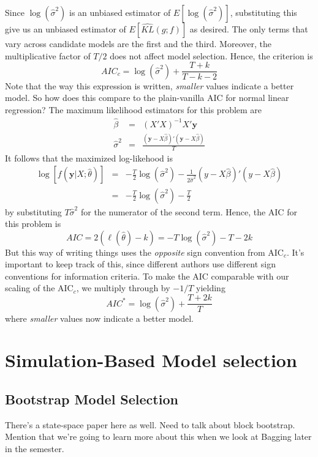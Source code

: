 \documentclass[12pt]{article}
\theoremstyle{definition}
\begin{document}
Since $\log(\widehat{\sigma}^2)$ is an unbiased estimator of $E[\log(\widehat{\sigma}^2)]$, substituting this give us an unbiased estimator of $E\left[\widehat{KL}(g;f) \right]$ as desired.
The only terms that vary across candidate models are the first and the third. Moreover, the multiplicative factor of $T/2$ does not affect model selection. Hence, the criterion is
$$AIC_c = \log(\widehat{\sigma}^2) + \frac{T + k}{T - k -2}$$
Note that the way this expression is written, \emph{smaller} values indicate a better model. So how does this compare to the plain-vanilla AIC for normal linear regression? The maximum likelihood estimators for this problem are
\begin{eqnarray*}
\widehat{\beta} &=& (X'X)^{-1}X'\mathbf{y}\\
\widehat{\sigma}^2 &=& \frac{(\mathbf{y} - X\widehat{\beta})'(\mathbf{y} - X\widehat{\beta})}{T}
\end{eqnarray*}
It follows that the maximized log-likehood is
\begin{eqnarray*}
\log\left[f(\mathbf{y}|X;\widehat{\theta})\right] &=& -\frac{T}{2} \log(\widehat{\sigma}^2) - \frac{1}{2\widehat{\sigma}^2}(y - X\widehat{\beta})'(y -X\widehat{\beta})\\
&=& -\frac{T}{2} \log(\widehat{\sigma}^2) - \frac{T}{2}
\end{eqnarray*}
by substituting $T\widehat{\sigma}^2$ for the numerator of the second term. Hence, the AIC for this problem is
$$AIC = 2\left(\ell(\widehat{\theta}) - k \right) = -T\log(\widehat{\sigma}^2) - T - 2k $$
But this way of writing things uses the \emph{opposite} sign convention from AIC$_c$. It's important to keep track of this, since different authors use different sign conventions for information criteria. To make the AIC comparable with our scaling of the AIC$_c$, we multiply through by $-1/T$ yielding
$$AIC^* = \log(\widehat{\sigma}^2) + \frac{T + 2k}{T}$$
where \emph{smaller} values now indicate a better model.

\section{Simulation-Based Model selection}

\subsection{Bootstrap Model Selection}
There's a state-space paper here as well. Need to talk about block bootstrap. Mention that we're going to learn more about this when we look at Bagging later in the semester.
\end{document}
